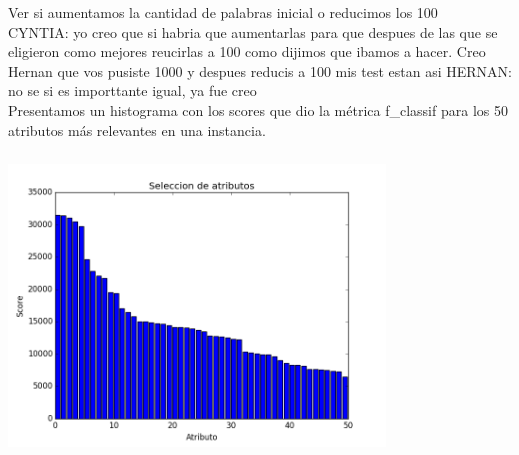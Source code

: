 {\Large Ver si aumentamos la cantidad de palabras inicial o reducimos los 100\\
CYNTIA: yo creo que si habria que aumentarlas para que despues de las que se eligieron como mejores reucirlas a 100 como dijimos que ibamos a hacer. Creo Hernan que vos pusiste 1000 y despues reducis a 100 mis test estan asi
HERNAN: no se si es importtante igual, ya fue creo
}\\

Presentamos un histograma con los scores que dio la métrica f\_classif para los 50 atributos más relevantes en una instancia. 
\begin{center}
\includegraphics[height=8cm, width=10cm]{Seleccion_atributos.png}
\end{center}